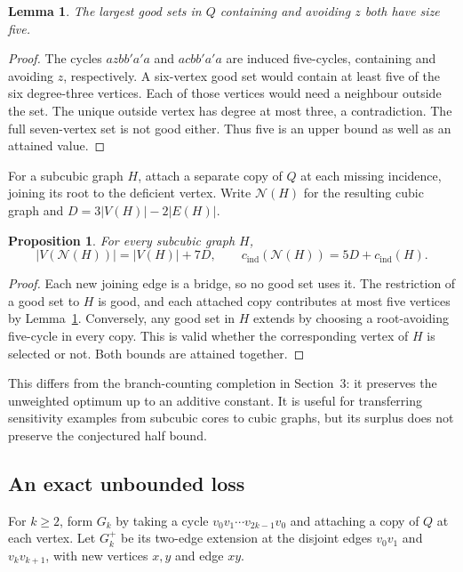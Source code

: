 \documentclass[11pt]{article}
\newtheorem{lemma}[theorem]{Lemma}
\newtheorem{proposition}[theorem]{Proposition}
\newcommand{\cind}{c_{\mathrm{ind}}}
\begin{document}
\begin{lemma}\label{lem:neutral-cap}
The largest good sets in $Q$ containing and avoiding $z$ both have size five.
\end{lemma}
\begin{proof}
The cycles $azbb'a'a$ and $acbb'a'a$ are induced five-cycles, containing
and avoiding $z$, respectively. A six-vertex good set would contain at
least five of the six degree-three vertices. Each of those vertices
would need a neighbour outside the set. The unique outside vertex has
degree at most three, a contradiction. The full seven-vertex set is
not good either. Thus five is an upper bound as well as an attained value.
\end{proof}

For a subcubic graph $H$, attach a separate copy of $Q$ at each missing
incidence, joining its root to the deficient vertex. Write $\mathcal N(H)$
for the resulting cubic graph and $D=3|V(H)|-2|E(H)|$.

\begin{proposition}\label{prop:neutral-completion}
For every subcubic graph $H$,
\[
 |V(\mathcal N(H))|=|V(H)|+7D,\qquad
 \cind(\mathcal N(H))=5D+\cind(H).
\]
\end{proposition}
\begin{proof}
Each new joining edge is a bridge, so no good set uses it. The
restriction of a good set to $H$ is good, and each attached copy
contributes at most five vertices by Lemma~\ref{lem:neutral-cap}.
Conversely, any good set in $H$ extends by choosing a root-avoiding
five-cycle in every copy. This is valid whether the corresponding
vertex of $H$ is selected or not. Both bounds are attained together.
\end{proof}

This differs from the branch-counting completion in Section~3:
it preserves the unweighted optimum up to an additive constant.
It is useful for transferring sensitivity examples from subcubic cores
to cubic graphs, but its surplus does not preserve the conjectured
half bound.

\subsection{An exact unbounded loss}
For $k\geq2$, form $G_k$ by taking a cycle
$v_0v_1\cdots v_{2k-1}v_0$ and attaching a copy of $Q$ at each vertex.
Let $G_k^+$ be its two-edge extension at the disjoint edges
$v_0v_1$ and $v_kv_{k+1}$, with new vertices $x,y$ and edge $xy$.
\end{document}
